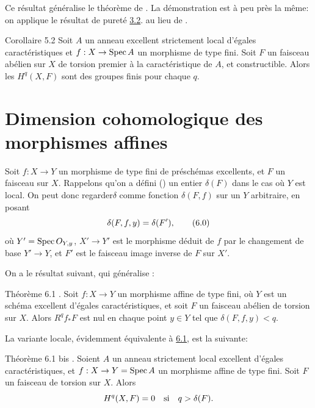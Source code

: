 \documentclass[10pt]{../fichiers-configuration-latex/smfart}
\begin{document}
Ce résultat généralise le théorème de . La démonstration est à
peu près la même: on applique le résultat de pureté
\hyperref[XIX.thm3.2]{3.2}. au lieu de 
.

\begin{enonce*}{Corollaire 5.2}
Soit $A$ un anneau excellent strictement local d'égales
caractéristiques et $f:X\rightarrow \operatorname{Spec} A$ un morphisme de type
fini. Soit $F$ un faisceau abélien sur $X$ de torsion premier à la
caractéristique de $A$, et constructible. Alors les $H^{q}(X,F)$ sont
des groupes finis pour chaque $q$.
\end{enonce*}

\section{Dimension cohomologique des morphismes affines}

Soit $f:X\rightarrow Y$ un morphisme de type fini de préschémas
excellents, et $F$ un faisceau sur $X$. Rappelons qu'on a défini 
() un entier $\delta(F)$ dans le cas où $Y$ est local. On peut donc
regarder\pageoriginale $\delta$ comme fonction $\delta(F,f)$ sur un $Y$
arbitraire, en posant
\begin{equation*}
\delta(F,f,y)=\delta(F'){},\tag{6.0}
\end{equation*}
où $Y'=\operatorname{Spec} O_{Y,y}$, $X'\rightarrow Y'$ est le morphisme déduit de
$f$ par le changement de base $Y'\rightarrow Y$, et $F'$ est le
faisceau image inverse de $F$ sur $X'$.

On a le résultat suivant, qui généralise :

\begin{enonce*}{Théorème 6.1}
\footnotemark. Soit $f:X\rightarrow Y$ un morphisme affine de type
fini, où $Y$ est un schéma excellent d'égales caractéristiques, et
soit $F$ un faisceau abélien de torsion sur $X$. Alors
$R^{q}f_{\ast}F$ est nul en chaque point $y\in Y$ tel que $\delta(F,f,y)<q$.
\end{enonce*}

La variante locale, évidemment équivalente à \hyperref[XIX.thm6.1]{6.1}, est la suivante:

\begin{enonce*}{Théorème 6.1 bis}
\footnotemark[1]. Soient $A$ un anneau strictement local excellent
d'égales caractéristiques, et $f:X\rightarrow Y=\operatorname{Spec} A$ un morphisme
affine de type fini. Soit $F$ un faisceau de torsion sur $X$. Alors
$$
H^{q}(X,F)=0\quad\text{\rm si}\quad q>\delta(F){}.
$$
\end{enonce*}
\end{document}
